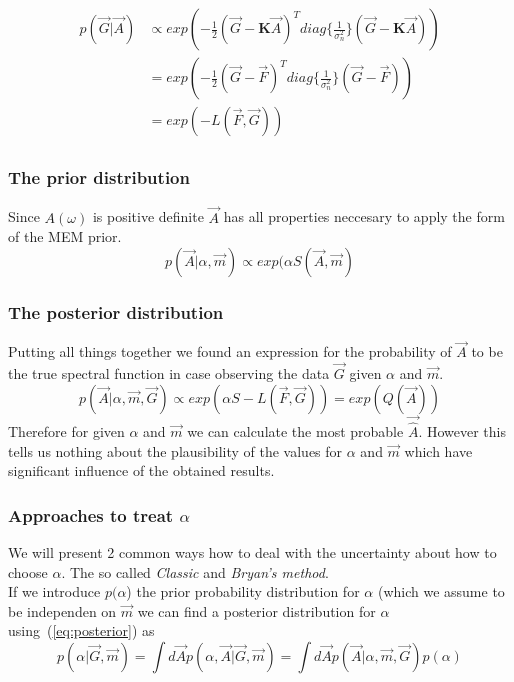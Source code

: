 \begin{align}\label{eq:likelihood function}
 \begin{split}
 p(\vec{G}|\vec{A}) & \propto  exp \left( -\frac{1}{2} (\vec{G}-\textbf{K}\vec{A})^T diag\{ \frac{1}{\sigma_n^2} \} (\vec{G}-\textbf{K}\vec{A})  \right)
 \\
 & = exp \left( -\frac{1}{2} (\vec{G}-\vec{F})^T diag\{ \frac{1}{\sigma_n^2} \} (\vec{G}-\vec{F})  \right)
 \\
 & = exp(- L(\vec{F},\vec{G}))  
 \end{split}
\end{align}

\subsubsection{The prior distribution}

Since $A(\omega)$ is positive definite $\vec{A}$ has all properties neccesary to apply the form of the MEM prior. 
\begin{equation}\label{eq:prior}
 p(\vec{A}|\alpha,\vec{m}) \propto exp(\alpha S(\vec{A},\vec{m})
\end{equation}

\subsubsection{The posterior distribution}

Putting all things together we found an expression for the probability of $\vec{A}$ to be the true spectral function in 
case observing the data $\vec{G}$ given $\alpha$ and $\vec{m}$.
\begin{equation}\label{eq:posterior}
 p(\vec{A}|\alpha,\vec{m},\vec{G}) \propto  exp(\alpha S - L(\vec{F},\vec{G})) = exp(Q(\vec{A}))
\end{equation}
Therefore for given $\alpha$ and $\vec{m}$ we can calculate the most probable $\vec{\hat{A}}$. However this tells us nothing about
the plausibility of the values for $\alpha$ and $\vec{m}$ which have significant influence of the obtained results.

\subsubsection{Approaches to treat $\alpha$}

We will present 2 common ways how to deal with the uncertainty about how to choose $\alpha$. The so called \textit{Classic} 
and \textit{Bryan's method}. 
\\
If we introduce $p(\alpha$) the prior probability distribution for $\alpha$ (which we assume to be independen on $\vec{m}$ 
we can find a posterior distribution for $\alpha$ using~(\ref{eq:posterior}) as
\begin{equation}
 p(\alpha | \vec{G},\vec{m}) = \int d\vec{A} p(\alpha,\vec{A}|\vec{G},\vec{m}) = \int d\vec{A} p(\vec{A}|\alpha,\vec{m},\vec{G})p(\alpha)
\end{equation}

